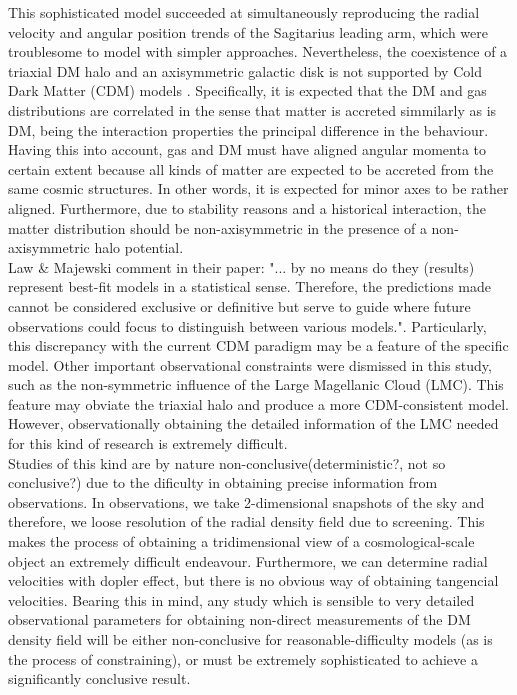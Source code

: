 This sophisticated model succeeded at simultaneously reproducing the radial velocity and angular position trends of the Sagitarius leading arm, which were troublesome to model with simpler approaches. 
Nevertheless, the coexistence of a triaxial DM halo and an axisymmetric galactic disk is not supported by Cold Dark Matter (CDM) models \cite{Debattista et al. 2008}. 
Specifically, it is expected that the DM and gas distributions are correlated in the sense that matter is accreted simmilarly as is DM, being the interaction properties the principal difference in the behaviour. 
Having this into account, gas and DM must have aligned angular momenta to certain extent because all kinds of matter are expected to be accreted from the same cosmic structures. 
In other words, it is expected for minor axes to be rather aligned. 
Furthermore, due to stability reasons and a historical interaction, the matter distribution should be non-axisymmetric in the presence of a non-axisymmetric halo potential.\\

Law & Majewski comment in their paper: "... by no means do they (results) represent best-fit models in a statistical sense. Therefore, the predictions made cannot be considered exclusive or definitive but serve to guide where future observations could focus to distinguish between various models.". 
Particularly, this discrepancy with the current CDM paradigm may be a feature of the specific model. 
Other important observational constraints were dismissed in this study, such as the non-symmetric influence of the Large Magellanic Cloud (LMC). 
This feature may obviate the triaxial halo and produce a more CDM-consistent model. 
However, observationally obtaining the detailed information of the LMC needed for this kind of research is extremely difficult.\\

Studies of this kind are by nature non-conclusive(deterministic?, not so conclusive?) due to the dificulty in obtaining precise information from observations. 
In observations, we take 2-dimensional snapshots of the sky and therefore, we loose resolution of the radial density field due to screening. 
This makes the process of obtaining  a tridimensional view of a cosmological-scale object an extremely difficult endeavour. 
Furthermore, we can determine radial velocities with dopler effect, but there is no obvious way of obtaining tangencial velocities. 
Bearing this in mind, any study which is sensible to very detailed observational parameters for obtaining non-direct measurements of the DM density field will be either non-conclusive for reasonable-difficulty models (as is the process of constraining), or must be extremely sophisticated to achieve a significantly conclusive result.\\

